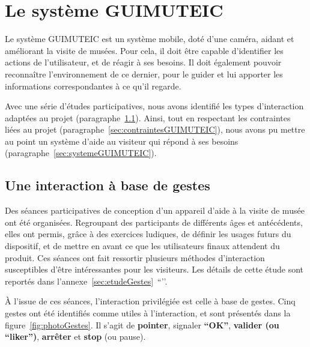 %
%
\section{Le système GUIMUTEIC}
\label{sec:GUIMUTEIC}

Le système GUIMUTEIC est un système mobile, doté d'une caméra, aidant et améliorant la visite de musées. 
Pour cela, il doit être capable d'identifier les actions de l'utilisateur, et de réagir à ses besoins. 
Il doit également pouvoir reconnaître l'environnement de ce dernier, pour le guider et lui apporter les informations correspondantes à ce qu'il regarde. 

Avec une série d'études participatives, nous avons identifié les types d'interaction adaptées au projet (paragraphe~\ref{sec:gestesGUIMUTEIC}). Ainsi, tout en respectant les contraintes liées au projet (paragraphe~\ref{sec:contraintesGUIMUTEIC}), nous avons pu mettre au point un système d'aide au visiteur qui répond à ses besoins (paragraphe~\ref{sec:systemeGUIMUTEIC}). 



%
%
\subsection{Une interaction à base de gestes}
\label{sec:gestesGUIMUTEIC}

Des séances participatives de conception d'un appareil d'aide à la visite de musée ont été organisées. 
Regroupant des participants de différents âges et antécédents, elles ont permis, grâce à des exercices ludiques, de définir les usages futurs du dispositif, et de mettre en avant ce que les utilisateurs finaux attendent du produit. 
Ces séances ont fait ressortir plusieurs méthodes d'interaction susceptibles d'être intéressantes pour les visiteurs.
Les détails de cette étude sont reportés dans l'annexe~\ref{sec:etudeGestes}~``’’.

\`A l'issue de ces séances, l'interaction privilégiée est celle à base de gestes. Cinq gestes ont été identifiés comme utiles à l'interaction, et sont présentés dans la figure~\ref{fig:photoGestes}. Il s'agit de \textbf{pointer}, signaler \textbf{``OK''}, \textbf{valider (ou ``liker'')}, \textbf{arrêter} et \textbf{stop} (ou pause).  

